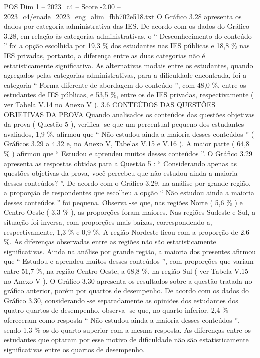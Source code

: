 \begin{textsample}{POS Dim 1 – 2023\_c4 – Score -2.00 – 2023\_c4/enade\_2023\_eng\_alim\_fbb702e518.txt}
O Gráfico 3.28 apresenta os dados por categoria administrativa das IES.
De acordo com os dados do Gráfico 3.28, em relação às categorias administrativas, o “ Desconhecimento do conteúdo ” foi a opção escolhida por 19,3 \% dos estudantes nas IES públicas e 18,8 \% nas IES privadas, portanto, a diferença entre as duas categorias não é estatisticamente significativa.
As alternativas modais entre os estudantes, quando agregados pelas categorias administrativas, para a dificuldade encontrada, foi a categoria “ Forma diferente de abordagem do conteúdo ”, com 48,0 \%, entre os estudantes de IES públicas, e 53,5 \%, entre os de IES privadas, respectivamente ( ver Tabela V.14 no Anexo V ). 3.6 CONTEÚDOS DAS QUESTÕES OBJETIVAS DA PROVA Quando analisados os conteúdos das questões objetivas da prova ( Questão 5 ), verifica -se que um percentual pequeno dos estudantes avaliados, 1,9 \%, afirmou que “ Não estudou ainda a maioria desses conteúdos ” ( Gráficos 3.29 a 4.32 e, no Anexo V, Tabelas V.15 e V.16 ).
A maior parte ( 64,8 \% ) afirmou que “ Estudou e aprendeu muitos desses conteúdos ”.
O Gráfico 3.29 apresenta as respostas obtidas para a Questão 5 : “ Considerando apenas as questões objetivas da prova, você percebeu que não estudou ainda a maioria desses conteúdos? ”.
De acordo com o Gráfico 3.29, na análise por grande região, a proporção de respondentes que escolheu a opção “ Não estudou ainda a maioria desses conteúdos ” foi pequena.
Observa -se que, nas regiões Norte ( 5,6 \% ) e Centro-Oeste ( 3,3 \% ), as proporções foram maiores.
Nas regiões Sudeste e Sul, a situação foi inversa, com proporções mais baixas, correspondendo a, respectivamente, 1,3 \% e 0,9 \%.
A região Nordeste ficou com a proporção de 2,6 \%.
As diferenças observadas entre as regiões não são estatisticamente significativas.
Ainda na análise por grande região, a maioria dos presentes afirmou que “ Estudou e aprendeu muitos desses conteúdos ”, com proporções que variam entre 51,7 \%, na região Centro-Oeste, a 68,8 \%, na região Sul ( ver Tabela V.15 no Anexo V ).
O Gráfico 3.30 apresenta os resultados sobre a questão tratada no gráfico anterior, porém por quartos de desempenho.
De acordo com os dados do Gráfico 3.30, considerando -se separadamente as opiniões dos estudantes dos quatro quartos de desempenho, observa -se que, no quarto inferior, 2,4 \% ofereceram como resposta “ Não estudou ainda a maioria desses conteúdos ”, sendo 1,3 \% os do quarto superior com a mesma resposta.
As diferenças entre os estudantes que optaram por esse motivo de dificuldade não são estatisticamente significativas entre os quartos de desempenho.

\end{textsample}
